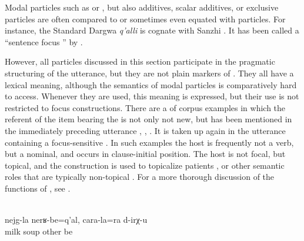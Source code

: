 Modal particles such as  or , but also additives, scalar additives, or exclusive particles are often compared to or sometimes even equated with  particles. For instance, the Standard Dargwa  \textit{q'alli} is cognate with Sanzhi . It has been called a ``sentence focus '' by \citet[74]{vandenBerg2001}.

However, all particles discussed in this section participate in the pragmatic structuring of the utterance, but they are not plain markers of . They all have a lexical meaning, although the semantics of modal particles is comparatively hard to access. Whenever they are used, this meaning is expressed, but their use is not restricted to focus constructions. There are a  of corpus examples in which the referent of the item bearing the  is not only not new, but has been mentioned in the immediately preceding utterance , , . It is taken up again in the utterance containing a focus-sensitive . In such examples the host is frequently not a verb, but a nominal, and occurs in clause-initial position. The host is not focal, but topical, and the construction is used to topicalize patients ,  or other semantic roles that are typically non-topical . For a more thorough discussion of the functions of , see \citet{ForkerSubmittedc}.
%
\begin{exe}
	\\\label{ex:There is milk soup and soup from other things@21}%
	\gll	nejg-la	nerʁ-be=q'al,	cara-la=ra	d-irχ-u\\
		milk	soup	other	be\\
	\glt	{}
\end{exe}
